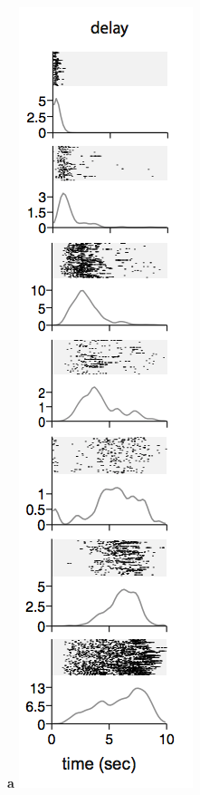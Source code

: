 \documentclass{apa}
\begin{document}
\begin{figure}
	\begin{minipage}{\linewidth}
	\begin{minipage}{.19\linewidth}
		\textbf{a}
		\includegraphics[width = \linewidth]{figs/MacDetal11.png}

\end{minipage}
\end{minipage}
\end{figure}
\end{document}
